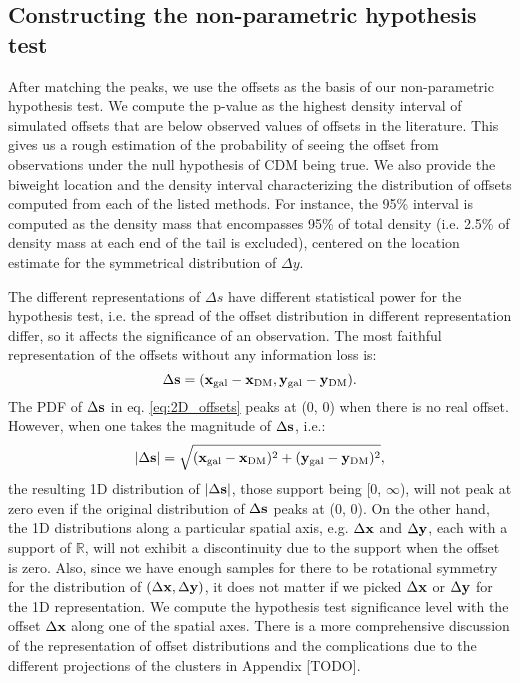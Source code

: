 \subsection{Constructing the non-parametric hypothesis test} 

After matching the peaks, we use the offsets as the basis of our 
non-parametric hypothesis test. 
We compute the p-value as the highest density interval of simulated offsets 
that are below observed values of 
offsets in the literature.  
This gives us a rough estimation of the probability 
of seeing the offset from observations under the null hypothesis of CDM 
being true. We also provide the biweight location and the density interval 
characterizing the 
distribution of offsets computed from each of the listed methods.
For instance, the 95\% interval is computed as the density mass that encompasses
95\% of total density (i.e. 2.5\% of density mass at each end of the tail is
excluded), centered on the location estimate for the symmetrical distribution
of $\Delta y$.

The different representations of $\Delta s$ have different statistical power
for the hypothesis test, i.e. the spread of the offset distribution in
different representation differ, so
it affects the significance of an observation. 
The most faithful representation of the offsets without any information loss
is:
\begin{equation}
	\Delta {\bf s} = ({\bf x}_{\rm gal} - {\bf x}_{\rm DM}, 
	{\bf y}_{\rm gal} - {\bf y}_{\rm DM} ).
	\label{eq:2D_offsets}
\end{equation}
The PDF of $\Delta {\bf s}$ in eq. \ref{eq:2D_offsets} peaks at (0, 0) when there is no real offset.
However, when one takes the magnitude of $\Delta {\bf s}$, i.e.:
\begin{equation}
	|\Delta {\bf s}| = \sqrt{({\bf x}_{\rm gal} - {\bf x}_{\rm DM})^2 + 
	({\bf y}_{\rm gal} - {\bf y}_{\rm DM})^2},
	\label{eq:magnitude_offsets}
\end{equation}
the resulting 1D distribution of $|\Delta {\bf s}|$, 
those support being [0, $\infty$),
will not peak at zero even if the original
distribution of $\Delta {\bf s}$ peaks at (0, 0). On the other hand, 
the 1D distributions along a particular spatial axis, 
e.g. $\Delta {\bf x}$ and $\Delta {\bf y}$,
each with a support of $\mathbb{R}$, will not exhibit a discontinuity due to
the support when
the offset is zero. Also, since we have enough samples for there to be
rotational symmetry for the distribution of $(\Delta {\bf x}, \Delta {\bf y})$, it does not
matter if we picked $\Delta {\bf x}$ or $\Delta {\bf y}$ for the 1D representation.
We compute the hypothesis test significance level with the 
 offset $\Delta {\bf x}$ along one of the spatial axes. 
There is a more comprehensive discussion of the representation of offset 
distributions and the complications due to the different projections of the
clusters in Appendix [TODO]. 
 

